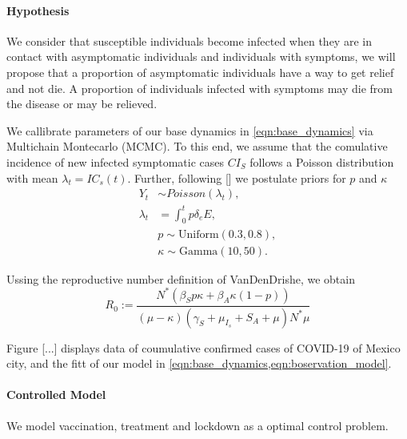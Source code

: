 \documentclass[a4paper,10pt]{amsart}
\begin{document}
         
        \paragraph{Hypothesis} We consider that susceptible individuals become
        infected when they are in contact with asymptomatic individuals and
        individuals with symptoms, we will propose that a proportion of
        asymptomatic individuals have a way to get relief and not die. A
        proportion of individuals infected with symptoms may die from the
        disease or may be relieved.

        	We callibrate parameters of our base dynamics in \eqref{eqn:base_dynamics}
        via Multichain Montecarlo (MCMC). To this end, we assume that the comulative 
        incidence of new infected symptomatic cases $CI_S$ 
        follows a Poisson distribution with mean $\lambda_t = IC_s(t)$. Further,
        following [] we postulate priors for $p$ and $\kappa$
        \begin{equation}
        	\label{eqn:boservation_model}
        	\begin{aligned}
        		Y_t & \sim Poisson(\lambda_t),
        		\\
        		\lambda_t 
        			&=
        			\int_{0}^t p \delta_e E ,
        		\\
        			& p \sim \text{Uniform} (0.3, 0.8),
        		\\
        			& \kappa \sim \text{Gamma}(10, 50).
        	\end{aligned}
        \end{equation}

    Ussing the reproductive number definition of VanDenDrishe, we obtain
	\begin{equation*}
		\label{eqn:reproductive_number}
		R_0 := 
			\frac{
				N^{*}(
					\beta_S p 
					\kappa + 
					\beta_A 
					\kappa(1-p) )
			}{
				(\mu - \kappa)( \gamma_S + \mu_{I_s} + S_A + \mu) 
				N^* \mu
			}
	\end{equation*}


        Figure [...] displays data of coumulative confirmed cases of COVID-19 of
    Mexico city, and the fitt of our model in 
    \cref{eqn:base_dynamics,eqn:boservation_model}.
    
    \paragraph{Controlled Model}
    We model vaccination, treatment and lockdown as a optimal control problem.
\end{document}
